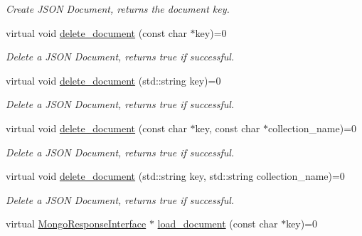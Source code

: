 \begin{DoxyCompactItemize}
\begin{DoxyCompactList}\small\item\em Create J\+S\+ON Document, returns the document key. \end{DoxyCompactList}\item 
virtual void \hyperlink{classMongoInterface_a9153c6d0c292aa76e51bf65c41d51f8d}{delete\+\_\+document} (const char $\ast$key)=0\hypertarget{classMongoInterface_a9153c6d0c292aa76e51bf65c41d51f8d}{}\label{classMongoInterface_a9153c6d0c292aa76e51bf65c41d51f8d}

\begin{DoxyCompactList}\small\item\em Delete a J\+S\+ON Document, returns true if successful. \end{DoxyCompactList}\item 
virtual void \hyperlink{classMongoInterface_a9e15069c0c05f9aa89918fd39c0e7a94}{delete\+\_\+document} (std\+::string key)=0\hypertarget{classMongoInterface_a9e15069c0c05f9aa89918fd39c0e7a94}{}\label{classMongoInterface_a9e15069c0c05f9aa89918fd39c0e7a94}

\begin{DoxyCompactList}\small\item\em Delete a J\+S\+ON Document, returns true if successful. \end{DoxyCompactList}\item 
virtual void \hyperlink{classMongoInterface_abc9fd636d41e508ede790754e4dbab86}{delete\+\_\+document} (const char $\ast$key, const char $\ast$collection\+\_\+name)=0\hypertarget{classMongoInterface_abc9fd636d41e508ede790754e4dbab86}{}\label{classMongoInterface_abc9fd636d41e508ede790754e4dbab86}

\begin{DoxyCompactList}\small\item\em Delete a J\+S\+ON Document, returns true if successful. \end{DoxyCompactList}\item 
virtual void \hyperlink{classMongoInterface_ae00271d50df56c537627031c0ecef0d6}{delete\+\_\+document} (std\+::string key, std\+::string collection\+\_\+name)=0\hypertarget{classMongoInterface_ae00271d50df56c537627031c0ecef0d6}{}\label{classMongoInterface_ae00271d50df56c537627031c0ecef0d6}

\begin{DoxyCompactList}\small\item\em Delete a J\+S\+ON Document, returns true if successful. \end{DoxyCompactList}\item 
virtual \hyperlink{classMongoResponseInterface}{Mongo\+Response\+Interface} $\ast$ \hyperlink{classMongoInterface_acc6a2b3cc3cf9dcbc0cdb44ddbd14674}{load\+\_\+document} (const char $\ast$key)=0\hypertarget{classMongoInterface_acc6a2b3cc3cf9dcbc0cdb44ddbd14674}{}\label{classMongoInterface_acc6a2b3cc3cf9dcbc0cdb44ddbd14674}


\end{DoxyCompactItemize}
